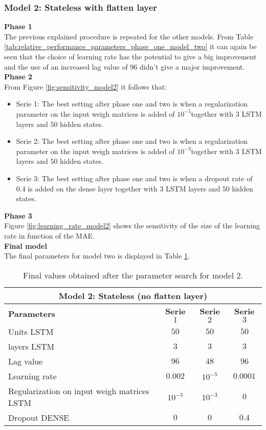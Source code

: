 \clearpage
\subsubsection{Model 2: Stateless with flatten layer}

\textbf{Phase 1}\\
The previous explained procedure is repeated for the other models. From Table \ref{tab:relative_performance_parameters_phase_one_model_two} it can again be seen that the choice of learning rate has the potential to give a big improvement and the use of an increased lag value of $ 96 $ didn't give a major improvement.\\ 

\textbf{Phase 2}\\
From Figure \ref{fig:sensitivity_model2} it follows that:
\begin{itemize}
	\item Serie 1: The best setting after phase one and two is when a regularization parameter on the input weigh matrices is added of $ 10^{-5} $together with $ 3 $ LSTM layers and $ 50 $ hidden states. 
	\item Serie 2: The best setting after phase one and two is when a regularization parameter on the input weigh matrices is added of $ 10^{-3} $together with $ 3 $ LSTM layers and $ 50 $ hidden states.
	\item Serie 3: The best setting after phase one and two is when a dropout rate of $ 0.4 $ is added on the dense layer together with $ 3 $ LSTM layers and $ 50 $ hidden states.
\end{itemize}

\textbf{Phase 3}\\
Figure \ref{fig:learning_rate_model2} shows the sensitivity of the size of the learning rate in function of the MAE.\\

\textbf{Final model}\\
The final parameters for model two is displayed in Table \ref{tab:final_model2}.

\begin{table}[h]
	\centering
	\begin{tabular}{@{}l|ccc@{}} \toprule
		\multicolumn{4}{c}{Model 2: Stateless (no flatten layer)}\\\midrule\midrule
		\textbf{Parameters}	& \textbf{Serie $ 1 $} & \textbf{Serie $ 2 $} & \textbf{Serie $ 3 $}\\\midrule
		Units LSTM & $50 $&$ 50 $  & $50 $\\
		layers LSTM & $3 $&$ 3 $  & $3$\\
		Lag value & $96 $&$ 48$  & $96$\\
		Learning rate & $0.002 $&$ 10^{-5}$  & $0.0001$\\\hline
		Regularization on input weigh matrices LSTM   & $ 10^{-5} $ & $ 10^{-3} $ & $ 0 $\\
		Dropout DENSE   & $ 0 $ & $ 0 $ & $ 0.4 $\\\bottomrule
	\end{tabular}
	\caption{Final values obtained after the parameter search for model 2.}
	\label{tab:final_model2}
\end{table}

